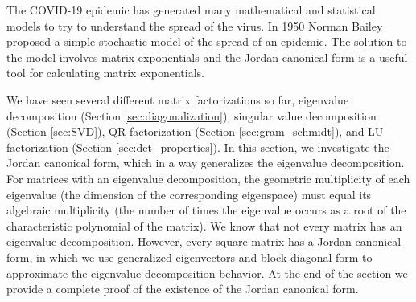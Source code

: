  \label{chap:JCF}

\vspace*{-17 pt}

\vspace*{13 pt}

\label{sec:appl_epidemic}   

The COVID-19 epidemic has generated many mathematical and statistical models to try to understand the spread of the virus. In 1950 Norman Bailey proposed a simple stochastic model of the spread of an epidemic. The solution to the model involves matrix exponentials and the Jordan canonical form is a useful tool for calculating matrix exponentials. 


\label{sec:jordan_intro}

We have seen several different matrix factorizations so far, eigenvalue decomposition (Section \ref{sec:diagonalization}), singular value decomposition (Section \ref{sec:SVD}), QR factorization (Section \ref{sec:gram_schmidt}), and LU factorization (Section \ref{sec:det_properties}). In this section, we investigate the Jordan canonical form, which in a way generalizes the eigenvalue decomposition. For matrices with an eigenvalue decomposition, the geometric multiplicity of each eigenvalue (the dimension of the corresponding eigenspace) must equal its algebraic multiplicity (the number of times the eigenvalue occurs as a root of the characteristic polynomial of the matrix). We know that not every matrix has an eigenvalue decomposition. However, every square matrix has a Jordan canonical form, in which we use generalized eigenvectors and block diagonal form to approximate the eigenvalue decomposition behavior. At the end of the section we provide a complete proof of the existence of the Jordan canonical form. 

